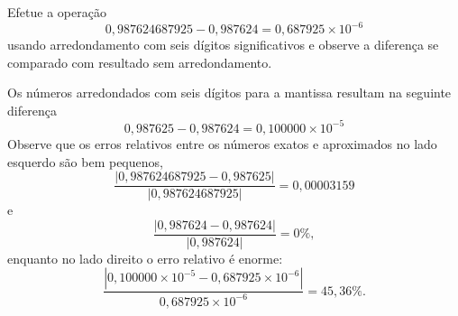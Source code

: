 \begin{ex}Efetue a operação
  \begin{equation}
    0,987624687925-0,987624=0,687925\times 10^{-6}
  \end{equation}
usando arredondamento com seis dígitos significativos e observe a diferença se comparado com resultado sem arredondamento.
\end{ex}
\begin{sol}
Os números arredondados com seis dígitos para a mantissa resultam na seguinte diferença
$$
0,987625-0,987624=0,100000\times 10^{-5}
$$
Observe que os erros relativos entre os números exatos e aproximados no lado esquerdo são bem pequenos,
\begin{equation}
  \frac{|0,987624687925-0,987625|}{|0,987624687925|}=0,00003159
\end{equation}
e
\begin{equation}
  \frac{|0,987624-0,987624|}{|0,987624|}=0\%,
\end{equation}
enquanto no lado direito o erro relativo é enorme:
\begin{equation}
\frac{|0,100000\times 10^{-5}-0,687925\times 10^{-6}|}{0,687925\times 10^{-6}}=45,36\%.
\end{equation}
\end{sol}


